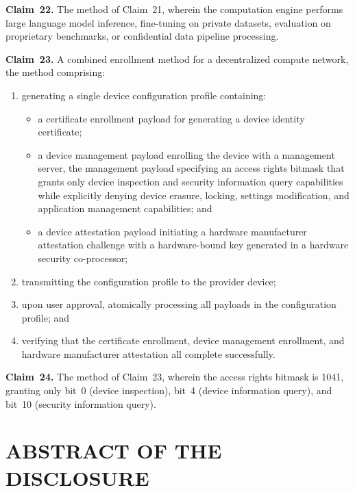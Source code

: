 \documentclass[11pt,letterpaper]{article}
\begin{document}
\textbf{Claim~22.} The method of Claim~21, wherein the computation engine performs large language model inference, fine-tuning on private datasets, evaluation on proprietary benchmarks, or confidential data pipeline processing.

\textbf{Claim~23.} A combined enrollment method for a decentralized compute network, the method comprising:

\begin{enumerate}[label=(\alph*),nosep]
\item generating a single device configuration profile containing:
  \begin{itemize}[nosep]
  \item a certificate enrollment payload for generating a device identity certificate;
  \item a device management payload enrolling the device with a management server, the management payload specifying an access rights bitmask that grants only device inspection and security information query capabilities while explicitly denying device erasure, locking, settings modification, and application management capabilities; and
  \item a device attestation payload initiating a hardware manufacturer attestation challenge with a hardware-bound key generated in a hardware security co-processor;
  \end{itemize}
\item transmitting the configuration profile to the provider device;
\item upon user approval, atomically processing all payloads in the configuration profile; and
\item verifying that the certificate enrollment, device management enrollment, and hardware manufacturer attestation all complete successfully.
\end{enumerate}

\textbf{Claim~24.} The method of Claim~23, wherein the access rights bitmask is 1041, granting only bit~0 (device inspection), bit~4 (device information query), and bit~10 (security information query).

\section*{ABSTRACT OF THE DISCLOSURE}
\end{document}
